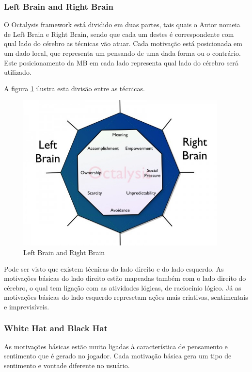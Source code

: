 \subsubsection{Left Brain and Right Brain}
\label{sub:leftright}
O Octalysis framework está dividido em duas partes, tais quais o Autor nomeia
de Left Brain e Right Brain, sendo que cada um destes é correspondente com qual lado do cérebro
as técnicas vão atuar. Cada motivação está posicionada em um dado local, que
representa um pensando de uma dada forma ou o contrário. Este posicionamento
da MB em cada lado representa qual lado do cérebro será utilizado.

A figura \ref{fig:octalysisleftright} ilustra esta divisão entre as técnicas.

\begin{figure}[h]
    \centering
    \includegraphics[width=400px, scale=1]{figuras/octalysisleftright}
    \caption{Left Brain and Right Brain}
    \label{fig:octalysisleftright}
\end{figure}

Pode ser visto que existem técnicas do lado direito e do lado esquerdo. As
motivações básicas do lado direito estão mapeadas também com o lado direito
do cérebro, o qual tem ligação com as atividades lógicas, de raciocínio lógico.
Já as motivações básicas do lado esquerdo represetam ações mais criativas,
sentimentais e imprevisíveis.

\subsubsection{White Hat and Black Hat}
\label{sub:whiteblack}
As motivações básicas estão muito ligadas à característica de pensamento e
sentimento que é gerado no jogador. Cada motivação básica gera um tipo de
sentimento e vontade diferente no usuário.

